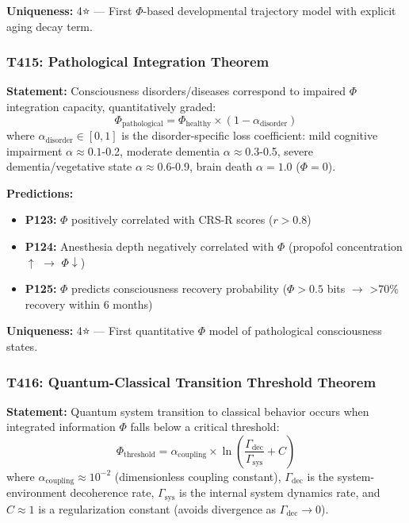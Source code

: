 \documentclass[12pt,a4paper]{article}
\begin{document}
\textbf{Uniqueness:} 4⭐ --- First $\Phi$-based developmental trajectory model with explicit aging decay term.

\subsubsection{T415: Pathological Integration Theorem}

\textbf{Statement:} Consciousness disorders/diseases correspond to impaired $\Phi$ integration capacity, quantitatively graded:
\begin{equation}
\Phi_{\text{pathological}} = \Phi_{\text{healthy}} \times (1 - \alpha_{\text{disorder}})
\end{equation}
where $\alpha_{\text{disorder}} \in [0,1]$ is the disorder-specific loss coefficient: mild cognitive impairment $\alpha \approx 0.1$-0.2, moderate dementia $\alpha \approx 0.3$-0.5, severe dementia/vegetative state $\alpha \approx 0.6$-0.9, brain death $\alpha = 1.0$ ($\Phi = 0$).

\textbf{Predictions:}
\begin{itemize}
\item \textbf{P123:} $\Phi$ positively correlated with CRS-R scores ($r > 0.8$)
\item \textbf{P124:} Anesthesia depth negatively correlated with $\Phi$ (propofol concentration $\uparrow$ $\to$ $\Phi \downarrow$)
\item \textbf{P125:} $\Phi$ predicts consciousness recovery probability ($\Phi > 0.5$ bits $\to$ >70\% recovery within 6 months)
\end{itemize}

\textbf{Uniqueness:} 4⭐ --- First quantitative $\Phi$ model of pathological consciousness states.

\subsubsection{T416: Quantum-Classical Transition Threshold Theorem}

\textbf{Statement:} Quantum system transition to classical behavior occurs when integrated information $\Phi$ falls below a critical threshold:
\begin{equation}
\Phi_{\text{threshold}} = \alpha_{\text{coupling}} \times \ln\left(\frac{\Gamma_{\text{dec}}}{\Gamma_{\text{sys}}} + C\right)
\end{equation}
where $\alpha_{\text{coupling}} \approx 10^{-2}$ (dimensionless coupling constant), $\Gamma_{\text{dec}}$ is the system-environment decoherence rate, $\Gamma_{\text{sys}}$ is the internal system dynamics rate, and $C \approx 1$ is a regularization constant (avoids divergence as $\Gamma_{\text{dec}} \to 0$).
\end{document}
